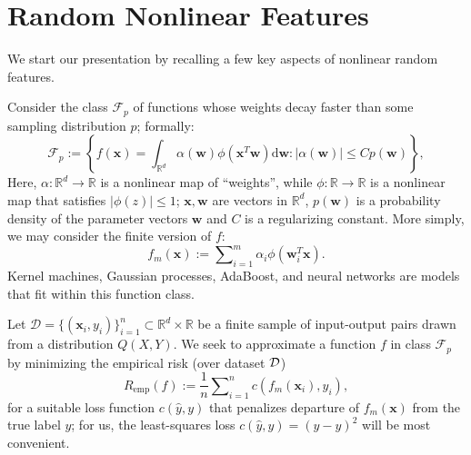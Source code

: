\documentclass{article}
\newcommand{\reals}{\mathbb{R}}
\begin{document}
  \section{Random Nonlinear Features}
  \label{sec:randomized}
  We start our presentation by recalling a few key aspects of nonlinear random
  features.

  Consider the class $\mathcal{F}_p$ of functions whose weights decay faster
  than some sampling distribution $p$; formally:
  \begin{equation}\label{eq:funclass}
    \mathcal{F}_p := \left\lbrace f(\bm x) = \int_{\mathbb{R}^{d}} \alpha(\bm w)
    \phi(\bm x^T\bm w) \mathrm{d}\bm w : |\alpha(\bm w)|\leq Cp(\bm w)
    \right\rbrace,
  \end{equation}
  Here, $\alpha : \reals^d \to \reals$ is a
  nonlinear map of ``weights'',  while $\phi : \mathbb{R} \rightarrow
  \mathbb{R}$ is a nonlinear map that satisfies $|\phi(z)| \leq 1$; $\bm x, \bm
  w$ are vectors in $\mathbb{R}^{d}$, $p(\bm w)$ is a probability density of
  the parameter vectors $\bm w$ and $C$ is a regularizing constant. More
  simply, we may consider the finite version of $f$:
  \begin{equation}\label{eq:finite}
      {f_m}(\bm x) := \sum\nolimits_{i=1}^m \alpha_i \phi(\bm{w}_i^T\bm x).
    \end{equation}
  Kernel machines, Gaussian processes, AdaBoost, and neural networks are models
  that fit within this function class.

  Let $\mathcal{D} = \{(\bm x_i, y_i)\}_{i=1}^n \subset \mathbb{R}^d \times
  \mathbb{R}$ be a finite sample of input-output pairs drawn from a
  distribution $Q(X,Y)$.  We seek to approximate a function $f$ in class
  $\mathcal{F}_p$ by minimizing the empirical risk (over dataset $\cal D$)
  \begin{equation}
    \label{eq:emp}
    R_{\text{emp}}(f) := \frac{1}{n}\sum\nolimits_{i=1}^n c(f_m(\bm{x}_i),y_i),
  \end{equation}
  for a suitable loss function $c(\hat{y},y)$ that penalizes departure of
    $f_m(\bm x)$ from the true label $y$; for us, the least-squares loss
    $c(\hat{y},y)=(\hat{y}-y)^2$ will be most convenient. 
\end{document}
